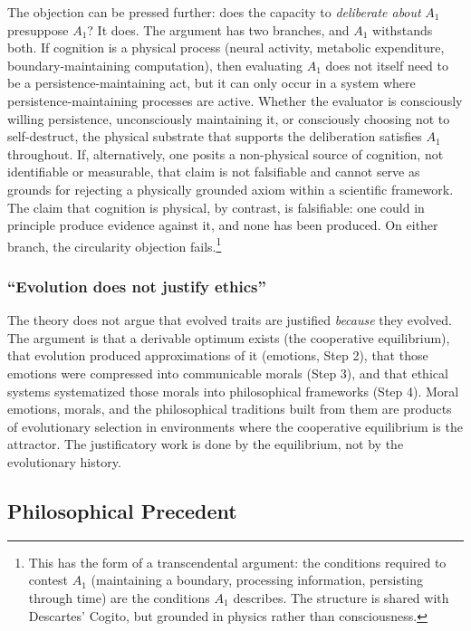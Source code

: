\documentclass[11pt]{article}
\theoremstyle{plain}
\theoremstyle{definition}
\theoremstyle{remark}
\newcounter{none}
\let\origsubsection\subsection
\renewcommand{\subsection}{\needspace{7\baselineskip}\origsubsection}
\let\origsubsubsection\subsubsection
\renewcommand{\subsubsection}{\needspace{4\baselineskip}\origsubsubsection}
\begin{document}
The objection can be pressed further: does the capacity to
\emph{deliberate about} \(A_1\) presuppose \(A_1\)? It does. The
argument has two branches, and \(A_1\) withstands both. If cognition is
a physical process (neural activity, metabolic expenditure,
boundary-maintaining computation), then evaluating \(A_1\) does not
itself need to be a persistence-maintaining act, but it can only occur
in a system where persistence-maintaining processes are active. Whether
the evaluator is consciously willing persistence, unconsciously
maintaining it, or consciously choosing not to self-destruct, the
physical substrate that supports the deliberation satisfies \(A_1\)
throughout. If, alternatively, one posits a non-physical source of
cognition, not identifiable or measurable, that claim is not falsifiable
and cannot serve as grounds for rejecting a physically grounded axiom
within a scientific framework. The claim that cognition is physical, by
contrast, is falsifiable: one could in principle produce evidence
against it, and none has been produced. On either branch, the
circularity objection fails.\footnote{This has the form of a
  transcendental argument: the conditions required to contest \(A_1\)
  (maintaining a boundary, processing information, persisting through
  time) are the conditions \(A_1\) describes. The structure is shared
  with Descartes' Cogito, but grounded in physics rather than
  consciousness.}

\subsubsection{``Evolution does not justify
ethics''}\label{evolution-does-not-justify-ethics}

The theory does not argue that evolved traits are justified
\emph{because} they evolved. The argument is that a derivable optimum
exists (the cooperative equilibrium), that evolution produced
approximations of it (emotions, Step 2), that those emotions were
compressed into communicable morals (Step 3), and that ethical systems
systematized those morals into philosophical frameworks (Step 4). Moral
emotions, morals, and the philosophical traditions built from them are
products of evolutionary selection in environments where the cooperative
equilibrium is the attractor. The justificatory work is done by the
equilibrium, not by the evolutionary history.

\subsection{Philosophical Precedent}\label{philosophical-precedent}
\end{document}
